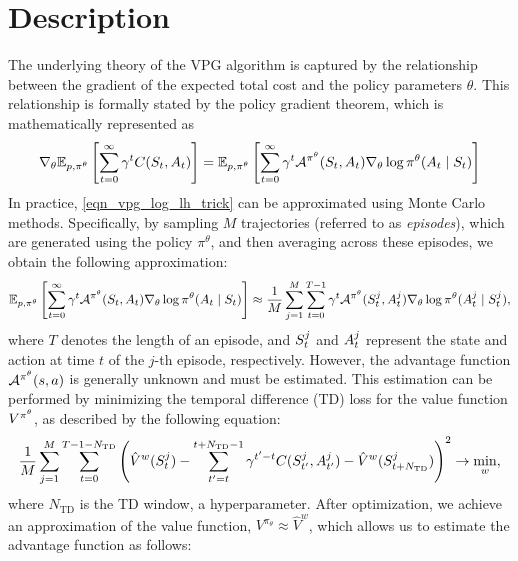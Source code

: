 \documentclass[12pt,twoside]{../../mitthesis}
\begin{document}
\section*{Description}
The underlying theory of the VPG algorithm is captured by the relationship between the gradient of the expected total cost and the policy parameters $\theta$. 
This relationship is formally stated by the policy gradient theorem, which is mathematically represented as
\begin{equation}
    \label{eqn_vpg_log_lh_trick}
    \nabla_{\theta} \E[\transit, \policy^{\theta}]{\sum_{t = 0}^{\infty} \gamma ^ t \Cost(\State_{t}, \Action_{t})} =  \E[\transit, \policy^{\theta}]{ \sum_{t = 0}^{\infty}\gamma^t\Advan^{\policy^{\theta}} (\State_t, \Action_t)\nabla_{\theta} \log \policy^{\theta}(\Action_t \mid \State_t)}
\end{equation}
In practice, \eqref{eqn_vpg_log_lh_trick} can be approximated using Monte Carlo methods. Specifically, by sampling $M$ trajectories (referred to as \textit{episodes}), which are generated using the policy $\pi^{\theta}$, and then averaging across these episodes, we obtain the following approximation:
\begin{equation}
    \label{eqn_vpg_objective_est0}
\E[\transit, \policy^{\theta}]{ \sum_{t = 0}^{\infty}\gamma^t\Advan^{\policy^{\theta}} (\State_t, \Action_t)\nabla_{\theta} \log \policy^{\theta}(\Action_t \mid \State_t)} \approx \frac{1}{M} \sum_{j = 1}^M \sum_{t=0}^{T-1} \gamma ^ t \Advan^{\policy^{\theta}}(\State_t^j, \Action_t^j) \nabla_{\theta} \log \policy^{\theta}(\Action_t^j \mid \State_t^j),
\end{equation}
where $T$ denotes the length of an episode, and  $S_t^j$  and $A_t^j$ represent the state and action at time $t$ of the $j$-th episode, respectively.
However, the advantage function $\mathcal A^{\pi^{\theta}}(s, a)$ is generally unknown and must be estimated. This estimation can be performed by minimizing the temporal difference (TD) loss for the value function  $V^{\pi^{\theta}}$, as described by the following equation:
\begin{equation}
    \label{eqn_td_loss}
    \frac{1}{M}\sum_{j=1}^M\sum_{t=0}^{T-1 - N_{\text{TD}}}\left(\hat\Value^w(\State_t^j) - \sum_{t'=t}^{t + N_{\text{TD}} - 1} \gamma^{t'-t}\Cost(\State_{t'}^j, \Action_{t'}^j) - \hat\Value^w(\State_{t + N_{\text{TD}}}^j)\right)^2 \ra \min_{w},
\end{equation}
where $N_{\text{TD}}$ is the TD window, a hyperparameter.
After optimization, we achieve an approximation of the value function, $V^{\pi_{\theta}} \approx \hat{V}^w$, which allows us to estimate the advantage function as follows: 
\end{document}
